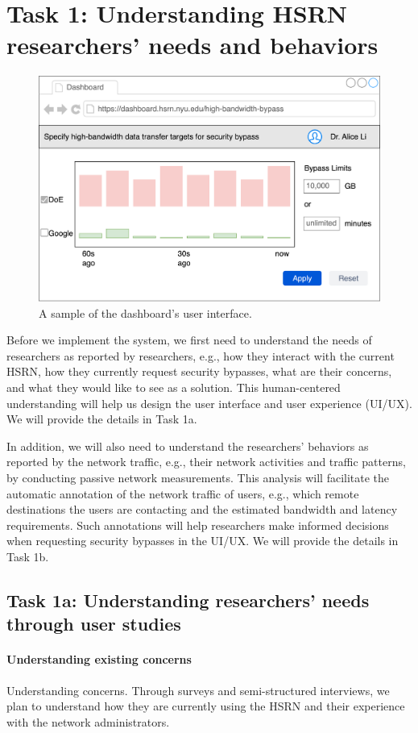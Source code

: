 \section{Task 1: Understanding HSRN researchers' needs and behaviors}

\begin{figure}[t]
    \centering
    \includegraphics[width=0.7\linewidth]{figures/dashboard.png}
    \caption{A sample of the dashboard's user interface.}
    \label{fig:dashboard}
\end{figure}


Before we implement the system, we first need to understand the needs of researchers as reported by researchers, e.g., how they interact with the current HSRN, how they currently request security bypasses, what are their concerns, and what they would like to see as a solution. This human-centered understanding will help us design the user interface and user experience (UI/UX). We will provide the details in Task 1a.

In addition, we will also need to understand the researchers' behaviors as reported by the network traffic, e.g., their network activities and traffic patterns, by conducting passive network measurements. This analysis will facilitate the automatic annotation of the network traffic of users, e.g., which remote destinations the users are contacting and the estimated bandwidth and latency requirements. Such annotations will help researchers make informed decisions when requesting security bypasses in the UI/UX. We will provide the details in Task 1b.

\subsection{Task 1a: Understanding researchers' needs through user studies}

\paragraph{Understanding existing concerns}
Understanding concerns. Through surveys and semi-structured interviews, we plan to understand how they are currently using the HSRN and their experience with the network administrators.


